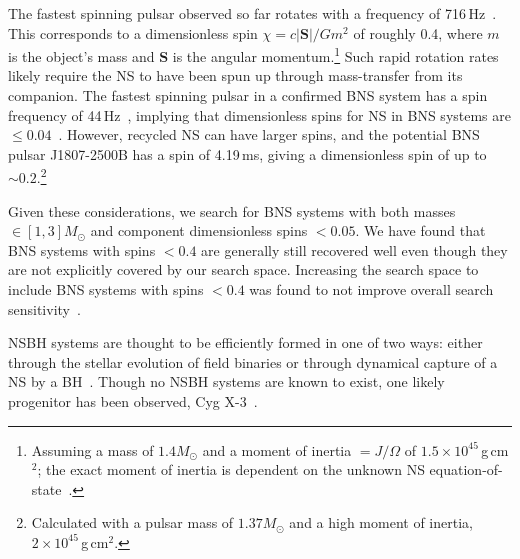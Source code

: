 \documentclass[twocolumn]{aastex6}
\begin{document}
The fastest spinning pulsar observed so far rotates with a frequency of 716\,Hz~\citep{Hessels:2006ze}. This
corresponds to a dimensionless spin $\chi = c | \mathbf{S} | / G m^2$ of roughly 0.4, where $m$ is the object's
mass and  $\mathbf{S}$ is the angular momentum.\footnote{Assuming a mass of $1.4{{M_\odot}}$ and
a moment of inertia $=J/\Omega$ of $1.5\times10^{45}$\,g\,cm$^2$; the exact moment of 
inertia is dependent on the unknown \ac{NS} equation-of-state~\citep{Lattimer:2012nd}.} Such
rapid rotation rates likely require the NS to have been spun up through mass-transfer
from its companion. The fastest spinning pulsar in a confirmed \ac{BNS} system has a
spin frequency of 44\,Hz~\citep{Kramer:2009zza}, implying that dimensionless
spins for NS in \ac{BNS} systems are $\leq 0.04$~\citep{Brown:2012qf}. However,
recycled NS can have larger spins, and the potential \ac{BNS} pulsar J1807-2500B
\citep{Lynch:2011aa} has
a spin of 4.19\,ms, giving a dimensionless spin of up to
$\sim0.2$.\footnote{Calculated with a pulsar mass of $1.37{{M_\odot}}$ and a
high moment of inertia, $2\times10^{45}$\,g\,cm$^2$.}

Given these considerations, we search for \ac{BNS} systems with both masses
$\in [1,3] M_{\odot}$ and component dimensionless spins $< 0.05$. We have found
that \ac{BNS} systems with spins $< 0.4$ are generally still recovered well even
though they are not explicitly covered by our search space. Increasing the
search space to include \ac{BNS} systems with spins $< 0.4$ was found to
not improve overall search sensitivity~\citep{nitzthesis}.

\ac{NSBH} systems are thought to be efficiently formed in one of two ways: either
through the stellar evolution of field binaries or through dynamical 
capture of a \ac{NS} by a \ac{BH}~\citep{Grindlay:2005ym,Sadowski:2007dz,Lee:2009ca,Benacquista:2011kv}. 
Though no \ac{NSBH} systems are known to 
exist, one likely progenitor has been observed, Cyg
X-3~\citep{Belczynski:2012jc}. 
\end{document}
